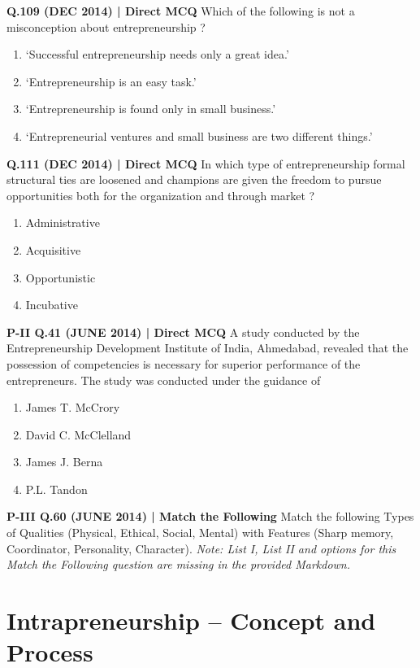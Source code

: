 \documentclass{article}
\begin{document}
\textbf{Q.109 (DEC 2014) | Direct MCQ}
Which of the following is not a misconception about entrepreneurship ?
\begin{enumerate}[label=(\arabic*)]
    \item ‘Successful entrepreneurship needs only a great idea.’
    \item ‘Entrepreneurship is an easy task.’
    \item ‘Entrepreneurship is found only in small business.’
    \item ‘Entrepreneurial ventures and small business are two different things.’
\end{enumerate}

\textbf{Q.111 (DEC 2014) | Direct MCQ}
In which type of entrepreneurship formal structural ties are loosened and champions are given the freedom to pursue opportunities both for the organization and through market ?
\begin{enumerate}[label=(\arabic*)]
    \item Administrative
    \item Acquisitive
    \item Opportunistic
    \item Incubative
\end{enumerate}

\textbf{P-II Q.41 (JUNE 2014) | Direct MCQ}
A study conducted by the Entrepreneurship Development Institute of India, Ahmedabad, revealed that the possession of competencies is necessary for superior performance of the entrepreneurs. The study was conducted under the guidance of
\begin{enumerate}[label=(\arabic*)]
    \item James T. McCrory
    \item David C. McClelland
    \item James J. Berna
    \item P.L. Tandon
\end{enumerate}

\textbf{P-III Q.60 (JUNE 2014) | Match the Following}
Match the following Types of Qualities (Physical, Ethical, Social, Mental) with Features (Sharp memory, Coordinator, Personality, Character).
\emph{Note: List I, List II and options for this Match the Following question are missing in the provided Markdown.}

\section{Intrapreneurship – Concept and Process}
\end{document}
